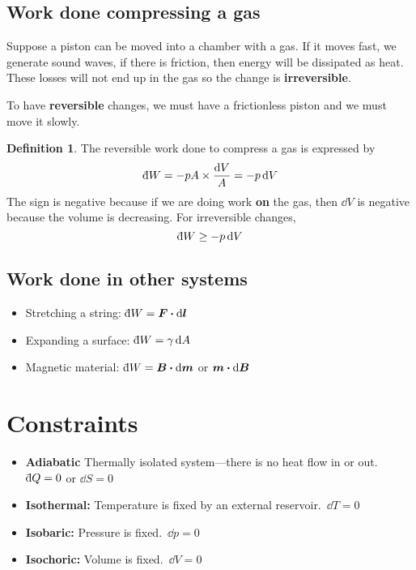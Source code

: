 \documentclass[12pt,chapterprefix=false,dvipsnames]{scrbook}
\theoremstyle{dotless}
\theoremstyle{definition}
\newtheorem{protodefinition}{Definition}[section]
\newenvironment{definition}
{\colorlet{shadecolor}{black!15}\begin{shaded}\begin{protodefinition}}
			{\end{protodefinition}\end{shaded}}
\def\vec#1{{\ensuremath{\bm{{#1}}}}}
\def\dbar{{\mathchar'26\mkern-10mu \mathrm{d}}}
\begin{document}
\subsection{Work done compressing a gas}%
\label{sub:work_done_compressing_a_gas}

Suppose a piston can be moved into a chamber with a gas. If it
moves fast, we generate sound waves, if there is friction, then
energy will be dissipated as heat. These losses will not end up
in the gas so the change is \textbf{irreversible}.

To have \textbf{reversible} changes, we must have a
frictionless piston and we must move it slowly.

\begin{definition}
	The reversible work done to compress a gas is expressed by
	\begin{equation}
		\label{eq:work_pdV}
		\dbar W
		=
		-pA \times \frac{\dd{V}}{A}
		=
		-p\dd{V}
	\end{equation}
	The sign is negative because if we are doing work
	\textbf{on} the gas, then $\dd{V}$ is
	negative because the volume is decreasing. For irreversible
	changes,
	\begin{equation}
		\dbar W
		\geq
		-p\dd{V}
	\end{equation}
\end{definition}

\subsection{Work done in other systems}%
\label{sub:work_done_in_other_systems}

\begin{itemize}
	\item Stretching a string: $\dbar W = \vec{F}\vdot\dd{\vec{l}}$
	\item Expanding a surface: $\dbar W = \gamma\dd{A}$
	\item Magnetic material: $\dbar W = \vec{B}\vdot\dd{\vec{m}}$ or
	      $\vec{m}\vdot\dd{\vec{B}}$
\end{itemize}

\section{Constraints}%
\label{sec:constraints}

\begin{itemize}
	\item \textbf{Adiabatic} Thermally isolated system---there is no
	      heat flow in or out.\, $\dbar Q = 0$ or
	      $\dd{S} = 0$
	\item \textbf{Isothermal:} Temperature is fixed by an external
	      reservoir.\, $\dd{T} = 0$
	\item \textbf{Isobaric:} Pressure is fixed.\,
	      $\dd{p} = 0$
	\item \textbf{Isochoric:} Volume is fixed.\, $\dd{V} = 0$
\end{itemize}
\end{document}
